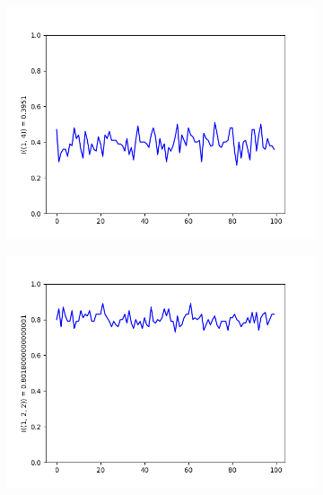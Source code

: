\documentclass{llncs}
\begin{document}
\begin{figure}
\begin{subfigure}{0.5\linewidth}
\end{subfigure}
\begin{subfigure}{0.5\linewidth}
\centering\includegraphics[scale=0.4]{images/1-4-consistent-partitions-probability.png}
\end{subfigure}
\begin{subfigure}{0.5\linewidth}
\centering\includegraphics[scale=0.4]{images/1-2-2-consistent-partitions-probability.png}
\end{subfigure}
\begin{subfigure}{0.5\linewidth}

\end{subfigure}
\end{figure}
\end{document}
